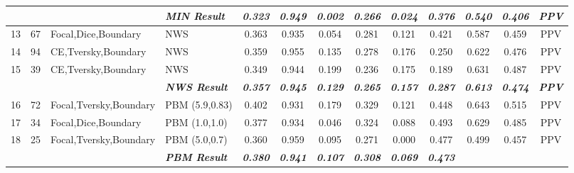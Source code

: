 \begin{table}[H]
{\begin{tabular}{ccl|l|c|c|c|c|c|c|c|c|c|}
  \textbf{} &
    \textit{\textbf{}} &
    \textbf{} &
    \textit{\textbf{MIN Result}} &
    \textit{\textbf{0.323}} &
    \textit{\textbf{0.949}} &
    \textit{\textbf{0.002}} &
    \textit{\textbf{0.266}} &
    \textit{\textbf{0.024}} &
    \textit{\textbf{0.376}} &
    \textit{\textbf{0.540}} &
    \textit{\textbf{0.406}} &
    \textit{\textbf{PPV}} \\ \hline
  \multicolumn{1}{|c|}{13} &
    \multicolumn{1}{c|}{67} &
    Focal,Dice,Boundary &
    NWS &
    0.363 &
    0.935 &
    0.054 &
    0.281 &
    0.121 &
    0.421 &
    0.587 &
    0.459 &
    PPV \\ \hline
  \multicolumn{1}{|c|}{14} &
    \multicolumn{1}{c|}{94} &
    CE,Tversky,Boundary &
    NWS &
    0.359 &
    0.955 &
    0.135 &
    0.278 &
    0.176 &
    0.250 &
    0.622 &
    0.476 &
    PPV \\ \hline
  \multicolumn{1}{|c|}{15} &
    \multicolumn{1}{c|}{39} &
    CE,Tversky,Boundary &
    NWS &
    0.349 &
    0.944 &
    0.199 &
    0.236 &
    0.175 &
    0.189 &
    0.631 &
    0.487 &
    PPV \\ \hline
  \textbf{} &
    \textit{\textbf{}} &
    \textbf{} &
    \textit{\textbf{NWS Result}} &
    \textit{\textbf{0.357}} &
    \textit{\textbf{0.945}} &
    \textit{\textbf{0.129}} &
    \textit{\textbf{0.265}} &
    \textit{\textbf{0.157}} &
    \textit{\textbf{0.287}} &
    \textit{\textbf{0.613}} &
    \textit{\textbf{0.474}} &
    \textit{\textbf{PPV}} \\ \hline
  \multicolumn{1}{|c|}{16} &
    \multicolumn{1}{c|}{72} &
    Focal,Tversky,Boundary &
    PBM (5.9,0.83) &
    0.402 &
    0.931 &
    0.179 &
    0.329 &
    0.121 &
    0.448 &
    0.643 &
    0.515 &
    PPV \\ \hline
  \multicolumn{1}{|c|}{17} &
    \multicolumn{1}{c|}{34} &
    Focal,Dice,Boundary &
    PBM (1.0,1.0) &
    0.377 &
    0.934 &
    0.046 &
    0.324 &
    0.088 &
    0.493 &
    0.629 &
    0.485 &
    PPV \\ \hline
  \multicolumn{1}{|c|}{18} &
    \multicolumn{1}{c|}{25} &
    Focal,Tversky,Boundary &
    PBM (5.0,0.7) &
    0.360 &
    0.959 &
    0.095 &
    0.271 &
    0.000 &
    0.477 &
    0.499 &
    0.457 &
    PPV \\ \hline
  \textbf{} &
    \textit{\textbf{}} &
    \textbf{} &
    \textit{\textbf{PBM Result}} &
    \textit{\textbf{0.380}} &
    \textit{\textbf{0.941}} &
    \textit{\textbf{0.107}} &
    \textit{\textbf{0.308}} &
    \textit{\textbf{0.069}} &
    \textit{\textbf{0.473}} &

\end{tabular}}
\end{table}
